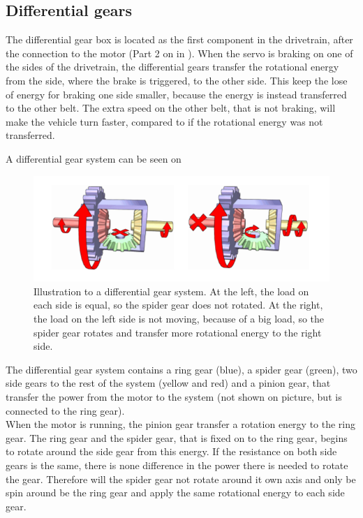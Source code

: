 \subsection{Differential gears} \label{sec:Differentialgears}

The differential gear box is located as the first component in the drivetrain, after the connection to the motor (Part 2 on  in ).
When the servo is braking on one of the sides of the drivetrain, the differential gears transfer the rotational energy from the side, where the brake is triggered, to the other side. This keep the lose of energy for braking one side smaller, because the energy is instead transferred to the other belt. The extra speed on the other belt, that is not braking, will make the vehicle turn faster, compared to if the rotational energy was not transferred.

A differential gear system can be seen on 

\begin{figure}[H]
	\centering
	\includegraphics[scale=0.7]{figures/diffGearLight}
	\caption{Illustration to a differential gear system. At the left, the load on each side is equal, so the spider gear does not rotated. At the right, the load on the left side is not moving, because of a big load, so the spider gear rotates and transfer more rotational energy to the right side. \cite{MechanicalEngineering}}
	\label{diffGearLight}
\end{figure}

The differential gear system contains a ring gear (blue), a spider gear (green), two side gears to the rest of the system (yellow and red) and a pinion gear, that transfer the power from the motor to the system (not shown on picture, but is connected to the ring gear).\\

When the motor is running, the pinion gear transfer a rotation energy to the ring gear. The ring gear and the spider gear, that is fixed on to the ring gear, begins to rotate around the side gear from this energy. If the resistance on both side gears is the same, there is none difference in the power there is needed to rotate the gear. Therefore will the spider gear not rotate around it own axis and only be spin around be the ring gear and apply the same rotational energy to each side gear.\\

